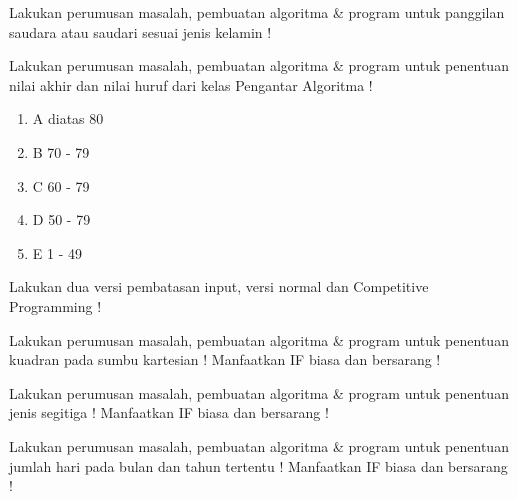 \begin{pemrograman}
Lakukan perumusan masalah, pembuatan algoritma \& program untuk panggilan saudara atau saudari sesuai jenis kelamin !
\end{pemrograman}

\begin{pemrograman}
Lakukan perumusan masalah, pembuatan algoritma \& program untuk penentuan nilai akhir dan nilai huruf dari kelas Pengantar Algoritma !
\begin{enumerate}
	\item A diatas 80
	\item B 70 - 79
	\item C 60 - 79
	\item D 50 - 79
	\item E 1 - 49
\end{enumerate}
Lakukan dua versi pembatasan input, versi normal dan Competitive Programming !
\end{pemrograman} 

\begin{pemrograman}
Lakukan perumusan masalah, pembuatan algoritma \& program untuk penentuan kuadran pada sumbu kartesian !
Manfaatkan IF biasa dan bersarang !
\end{pemrograman}

\begin{pemrograman}
Lakukan perumusan masalah, pembuatan algoritma \& program untuk penentuan jenis segitiga !
Manfaatkan IF biasa dan bersarang !
\end{pemrograman}

\begin{pemrograman}
Lakukan perumusan masalah, pembuatan algoritma \& program untuk penentuan jumlah hari pada bulan dan tahun tertentu !
Manfaatkan IF biasa dan bersarang !
\end{pemrograman}
